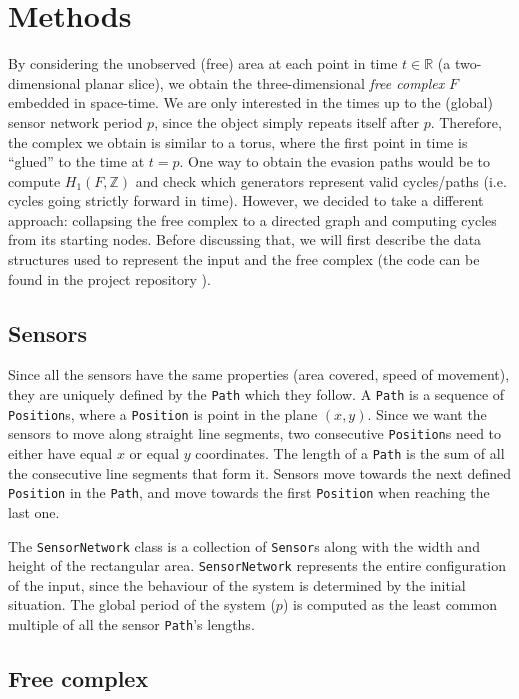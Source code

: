 \documentclass{article}
\begin{document}
\section{Methods}

By considering the unobserved (free) area at each point in time $t \in \mathbb{R}$ (a two-dimensional planar slice), we obtain the three-dimensional {\it free complex} $F$ embedded in space-time.
We are only interested in the times up to the (global) sensor network period $p$, since the object simply repeats itself after $p$.
Therefore, the complex we obtain is similar to a torus, where the first point in time is ``glued'' to the time at $t = p$.
One way to obtain the evasion paths would be to compute $ H_1 (F, \mathbb{Z}) $ and check which generators represent valid cycles/paths (i.e. cycles going strictly forward in time).
However, we decided to take a different approach: collapsing the free complex to a directed graph and computing cycles from its starting nodes. Before discussing that, we will first describe the data structures used to represent the input and the free complex (the code can be found in the project repository \cite{githubrepo}).

\subsection{Sensors}

Since all the sensors have the same properties (area covered, speed of movement), they are uniquely defined by the \texttt{Path} which they follow.
A \texttt{Path} is a sequence of \texttt{Position}s, where a \texttt{Position} is point in the plane $(x, y)$.
Since we want the sensors to move along straight line segments, two consecutive \texttt{Position}s need to either have equal $x$ or equal $y$ coordinates.
The length of a \texttt{Path} is the sum of all the consecutive line segments that form it.
Sensors move towards the next defined \texttt{Position} in the \texttt{Path}, and move towards the first \texttt{Position} when reaching the last one.

The \texttt{SensorNetwork} class is a collection of \texttt{Sensor}s along with the width and height of the rectangular area.
\texttt{SensorNetwork} represents the entire configuration of the input, since the behaviour of the system is determined by the initial situation.
The global period of the system ($p$) is computed as the least common multiple of all the sensor \texttt{Path}'s lengths.

\subsection{Free complex} \label{sec:free_complex}
\end{document}
